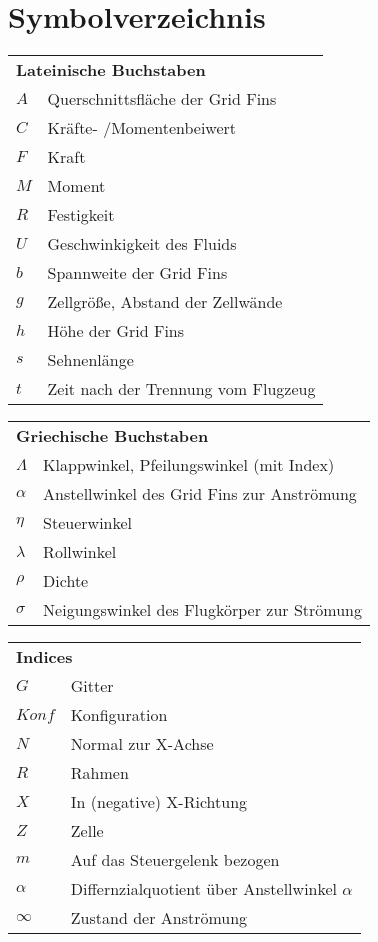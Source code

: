 \chapter*{Symbolverzeichnis}						%

\begin{longtable}[l]{ll}
\multicolumn{2}{l}{\textbf{Lateinische Buchstaben}}\\
$A$&Querschnittsfläche der Grid Fins\\
$C$&Kräfte- /Momentenbeiwert\\
$F$&Kraft\\
$M$&Moment\\
$R$&Festigkeit\\
$U$&Geschwinkigkeit des Fluids\\
$b$&Spannweite der Grid Fins\\
$g$&Zellgröße, Abstand der Zellwände\\
$h$&Höhe der Grid Fins\\
$s$&Sehnenlänge\\
$t$&Zeit nach der Trennung vom Flugzeug\\
\end{longtable}


\begin{longtable}[l]{ll}
	\multicolumn{2}{l}{\textbf{Griechische Buchstaben}}\\
	$\Lambda$&Klappwinkel, Pfeilungswinkel (mit Index)\\
	$\alpha$&Anstellwinkel des Grid Fins zur Anströmung\\
	$\eta$&Steuerwinkel\\
	$\lambda$&Rollwinkel\\
	$\rho$&Dichte\\
	$\sigma$&Neigungswinkel des Flugkörper zur Strömung\\
\end{longtable}

\begin{longtable}[l]{ll}
	\multicolumn{2}{l}{\textbf{Indices}}\\
	$G$&Gitter\\
	$Konf$&Konfiguration\\
	$N$&Normal zur X-Achse\\
	$R$&Rahmen\\
	$X$&In (negative) X-Richtung\\
	$Z$&Zelle\\
	$m$&Auf das Steuergelenk bezogen\\
	$\alpha$&Differnzialquotient über Anstellwinkel $\alpha$\\
	$\infty$&Zustand der Anströmung\\
\end{longtable}

